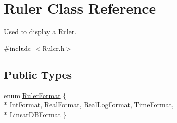 \hypertarget{class_ruler}{}\section{Ruler Class Reference}
\label{class_ruler}


Used to display a \hyperlink{class_ruler}{Ruler}.  




{\ttfamily \#include $<$Ruler.\+h$>$}

\subsection*{Public Types}
\begin{DoxyCompactItemize}
\item 
enum \hyperlink{class_ruler_af58442bc79afc26e7b9f7735e1f6e198}{Ruler\+Format} \{ \\*
\hyperlink{class_ruler_af58442bc79afc26e7b9f7735e1f6e198aba68a1adce860f0e30519cfc2b280272}{Int\+Format}, 
\hyperlink{class_ruler_af58442bc79afc26e7b9f7735e1f6e198aad1375df5e28b7c8146f9f6cfb1c25c6}{Real\+Format}, 
\hyperlink{class_ruler_af58442bc79afc26e7b9f7735e1f6e198ae827b2a3942fcd4e249908e9661e40c7}{Real\+Log\+Format}, 
\hyperlink{class_ruler_af58442bc79afc26e7b9f7735e1f6e198a0d5f7027738e4fcb20f14cb4dcdb12bf}{Time\+Format}, 
\\*
\hyperlink{class_ruler_af58442bc79afc26e7b9f7735e1f6e198a95750ee90dccdfc672979587e4182859}{Linear\+D\+B\+Format}
 \}
\end{DoxyCompactItemize}
